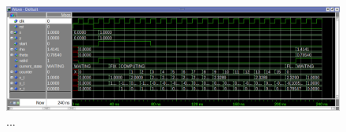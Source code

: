 \begin{figure}[!ht]
    \centering
    \includegraphics[width=\textwidth]{./images/Verification/wavesmall.png}
    \caption{...}
    \label{fig:wavesmall}
\end{figure}


